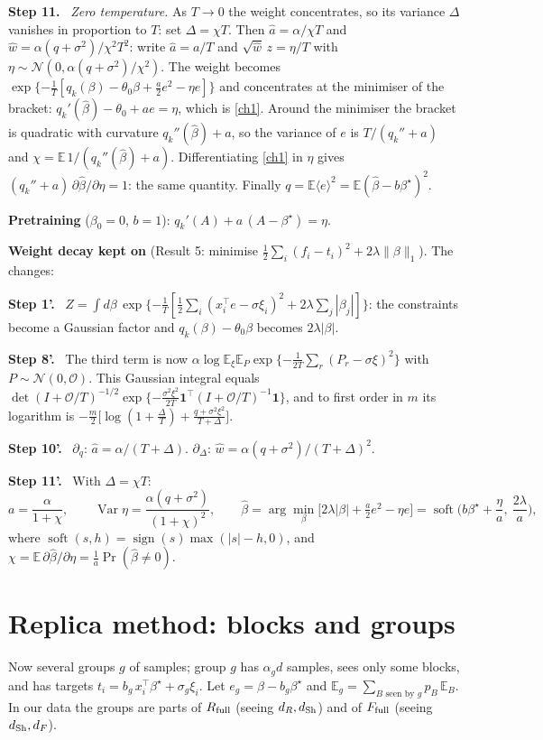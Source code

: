 \documentclass[10pt]{article}
\newcommand{\bs}{\beta^\star}\newcommand{\E}{\mathbb E}\newcommand{\asinh}{\operatorname{arcsinh}}\newcommand{\sk}{\sqrt k}
\newcommand{\Rf}{R_{\rm full}}\newcommand{\Ff}{F_{\rm full}}\newcommand{\dSh}{d_{\rm Sh}}
\newcommand{\step}[1]{\par\smallskip\textbf{Step #1.}\ }
\begin{document}
\step{11} \emph{Zero temperature.} As $T\to0$ the weight concentrates, so its variance $\Delta$ vanishes in proportion to $T$: set $\Delta=\chi T$. Then $\hat a=\alpha/\chi T$ and $\hat w=\alpha(q+\sigma^2)/\chi^2T^2$: write $\hat a=a/T$ and $\sqrt{\hat w}\,z=\eta/T$ with $\eta\sim\mathcal N(0,\alpha(q+\sigma^2)/\chi^2)$. The weight becomes $\exp\{-\frac1T[q_k(\beta)-\theta_0\beta+\frac a2e^2-\eta e]\}$ and concentrates at the minimiser of the bracket: $q_k'(\hat\beta)-\theta_0+ae=\eta$, which is \eqref{ch1}. Around the minimiser the bracket is quadratic with curvature $q_k''(\hat\beta)+a$, so the variance of $e$ is $T/(q_k''+a)$ and $\chi=\E\,1/(q_k''(\hat\beta)+a)$. Differentiating \eqref{ch1} in $\eta$ gives $(q_k''+a)\,\partial\hat\beta/\partial\eta=1$: the same quantity. Finally $q=\E\langle e\rangle^2=\E(\hat\beta-b\bs)^2$.

\textbf{Pretraining} ($\beta_0=0$, $b=1$): $q_k'(A)+a\,(A-\bs)=\eta$.

\textbf{Weight decay kept on} (Result 5: minimise $\frac12\sum_i(f_i-t_i)^2+2\lambda\|\beta\|_1$). The changes:
\step{1'} $Z=\int d\beta\,\exp\{-\frac1T[\frac12\sum_i(x_i^\top e-\sigma\xi_i)^2+2\lambda\sum_j|\beta_j|]\}$: the constraints become a Gaussian factor and $q_k(\beta)-\theta_0\beta$ becomes $2\lambda|\beta|$.
\step{8'} The third term is now $\alpha\log\E_\xi\E_P\exp\{-\frac1{2T}\sum_r(P_r-\sigma\xi)^2\}$ with $P\sim\mathcal N(0,\mathcal O)$. This Gaussian integral equals $\det(I+\mathcal O/T)^{-1/2}\exp\{-\frac{\sigma^2\xi^2}{2T}\mathbf 1^\top(I+\mathcal O/T)^{-1}\mathbf 1\}$, and to first order in $m$ its logarithm is $-\frac m2\big[\log(1+\frac\Delta T)+\frac{q+\sigma^2\xi^2}{T+\Delta}\big]$.
\step{10'} $\partial_q$: $\hat a=\alpha/(T+\Delta)$. $\partial_\Delta$: $\hat w=\alpha(q+\sigma^2)/(T+\Delta)^2$.
\step{11'} With $\Delta=\chi T$:
\[
a=\frac{\alpha}{1+\chi},\qquad\operatorname{Var}\eta=\frac{\alpha(q+\sigma^2)}{(1+\chi)^2},\qquad\hat\beta=\arg\min_\beta\big[2\lambda|\beta|+\tfrac a2e^2-\eta e\big]=\operatorname{soft}\Big(b\bs+\frac\eta a,\ \frac{2\lambda}a\Big),
\]
where $\operatorname{soft}(s,h)=\operatorname{sign}(s)\max(|s|-h,0)$, and $\chi=\E\,\partial\hat\beta/\partial\eta=\frac1a\Pr(\hat\beta\neq0)$.

\section{Replica method: blocks and groups}
Now several groups $g$ of samples; group $g$ has $\alpha_gd$ samples, sees only some blocks, and has targets $t_i=b_g\,x_i^\top\bs+\sigma_g\xi_i$. Let $e_g=\beta-b_g\bs$ and $\E_g=\sum_{B\text{ seen by }g}p_B\,\E_B$. In our data the groups are parts of $\Rf$ (seeing $d_R,\dSh$) and of $\Ff$ (seeing $\dSh,d_F$).
\end{document}
